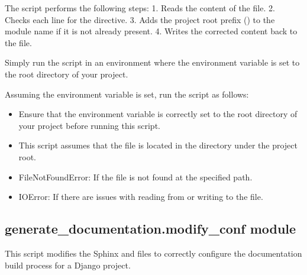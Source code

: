 \documentclass[letterpaper,10pt,english]{sphinxmanual}
\begin{document}
\sphinxAtStartPar
The script performs the following steps:
1. Reads the content of the  file.
2. Checks each line for the  directive.
3. Adds the project root prefix () to the module name if it is not already present.
4. Writes the corrected content back to the  file.
\begin{description}
\sphinxAtStartPar
Simply run the script in an environment where the  environment variable is set 
to the root directory of your project.

\sphinxAtStartPar
Assuming the  environment variable is set, run the script as follows:

\sphinxAtStartPar
{}

\begin{itemize}
\item {} 
\sphinxAtStartPar
Ensure that the  environment variable is correctly set to the root directory 
of your project before running this script.

\item {} 
\sphinxAtStartPar
This script assumes that the  file is located in the  directory 
under the project root.

\end{itemize}

\begin{itemize}
\item {} 
\sphinxAtStartPar
FileNotFoundError: If the  file is not found at the specified path.

\item {} 
\sphinxAtStartPar
IOError: If there are issues with reading from or writing to the  file.

\end{itemize}

\end{description}


\subsection{generate\_documentation.modify\_conf module}
\label{\detokenize{generate_documentation:module-generate_documentation.modify_conf}}\label{\detokenize{generate_documentation:generate-documentation-modify-conf-module}}
\sphinxAtStartPar
This script modifies the Sphinx  and  files to correctly 
configure the documentation build process for a Django project.
\end{document}
